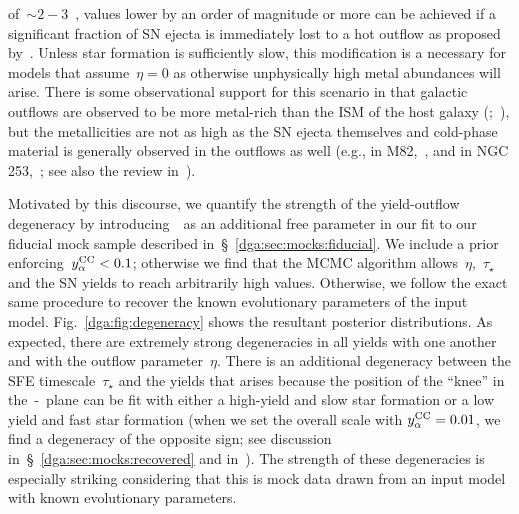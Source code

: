 of~$\sim2 - 3$~\citep{Griffith2021b}, values lower by an order of magnitude or
more can be achieved if a significant fraction of SN ejecta is immediately
lost to a hot outflow as proposed by~\citet{Peeples2011}.
Unless star formation is sufficiently slow, this modification is a necessary
for models that assume~$\eta = 0$ as otherwise unphysically high metal
abundances will arise.
There is some observational support for this scenario in that galactic outflows
are observed to be more metal-rich than the ISM of the host galaxy
(\citealp*{Chisholm2018};~\citealp{Cameron2021}), but the metallicities are
not as high as the SN ejecta themselves and cold-phase material is generally
observed in the outflows as well (e.g., in M82,~\citealp{Lopez2020}, and in
NGC 253,~\citealp{Lopez2023}; see also the review in~\citealt{Veilleux2020}).
\par
Motivated by this discourse, we quantify the strength of the yield-outflow
degeneracy by introducing~\yacc~as an additional free parameter in our fit to
our fiducial mock sample described in~\S~\ref{dga:sec:mocks:fiducial}.
We include a prior enforcing~$y_\alpha^\text{CC} < 0.1$; otherwise we find that the MCMC
algorithm allows~$\eta$,~$\tau_\star$ and the SN yields to reach arbitrarily
high values.
Otherwise, we follow the exact same procedure to recover the known evolutionary
parameters of the input model.
Fig.~\ref{dga:fig:degeneracy} shows the resultant posterior distributions.
As expected, there are extremely strong degeneracies in all yields with one
another and with the outflow parameter~$\eta$.
There is an additional degeneracy between the SFE timescale~$\tau_\star$ and
the yields that arises because the position of the ``knee'' in
the~\afe-\feh~plane can be fit with either a high-yield and slow star formation
or a low yield and fast star formation (when we set the overall scale with
$y_\alpha^\text{CC} = 0.01$, we find a degeneracy of the opposite sign; see discussion
in~\S~\ref{dga:sec:mocks:recovered} and in~\citealt{Weinberg2017b}).
The strength of these degeneracies is especially striking considering that this
is mock data drawn from an input model with known evolutionary parameters.

